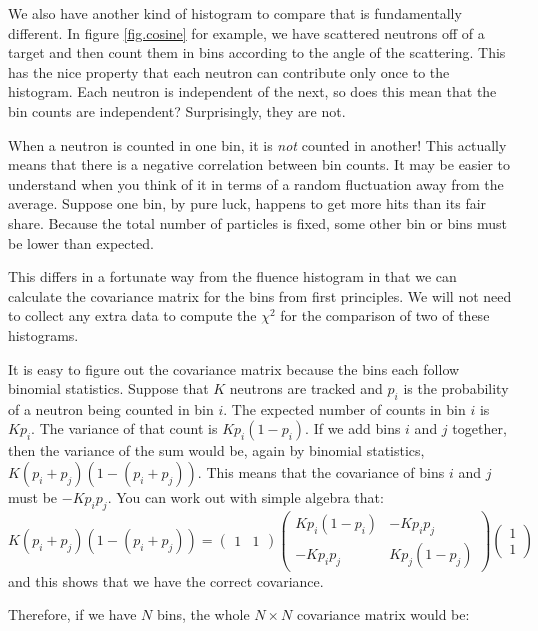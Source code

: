 \documentclass[letterpaper,12pt]{article}
\begin{document}
We also have another kind of histogram to compare that is fundamentally different. In figure \ref{fig.cosine} for example, we have scattered neutrons off of a target and then count them in bins according to the angle of the scattering. This has the nice property that each neutron can contribute only once to the histogram. Each neutron is independent of the next, so does this mean that the bin counts are independent? Surprisingly, they are not.

When a neutron is counted in one bin, it is \textit{not} counted in another! This actually means that there is a negative correlation between bin counts. It may be easier to understand when you think of it in terms of a random fluctuation away from the average. Suppose one bin, by pure luck, happens to get more hits than its fair share. Because the total number of particles is fixed, some other bin or bins must be lower than expected.

This differs in a fortunate way from the fluence histogram in that we can calculate the covariance matrix for the bins from first principles. We will not need to collect any extra data to compute the $\chi^2$ for the comparison of two of these histograms.

It is easy to figure out the covariance matrix because the bins each follow binomial statistics. Suppose that $K$ neutrons are tracked and $p_i$ is the probability of a neutron being counted in bin $i$. The expected number of counts in bin $i$ is $Kp_i$. The variance of that count is $Kp_i(1-p_i)$. If we add bins $i$ and $j$ together, then the variance of the sum would be, again by binomial statistics, $K(p_i+p_j)(1-(p_i+p_j))$. This means that the covariance of bins $i$ and $j$ must be $-Kp_ip_j$. You can work out with simple algebra that:
\begin{equation}
	K(p_i+p_j)(1-(p_i+p_j))=
	\begin{pmatrix}
		1 & 1
	\end{pmatrix}
	\begin{pmatrix}
	Kp_i(1-p_i) & -Kp_ip_j \\
	-Kp_ip_j & Kp_j(1-p_j) 
	\end{pmatrix}
	\begin{pmatrix}
	1 \\
	1
	\end{pmatrix}
\end{equation}
and this shows that we have the correct covariance.

Therefore, if we have $N$ bins, the whole $N \times N$ covariance matrix would be:
\end{document}

